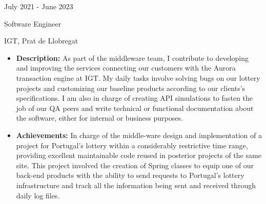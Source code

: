 \documentclass[a4paper,10pt]{article}
\newlength{\cvcolumngapwidth}
\newlength{\cvleftcolumnwidth}
\newlength{\cvrightcolumnwidth}
\newcommand{\cvtitlestyle}[1]{{\large\cvtitlefont\textcolor{cvtitlecolor}{#1}}}
\newcommand{\cvdurationstyle}[1]{{\small\cvdurationfont\textcolor{cvdurationcolor}{#1}}}
\newlength{\cvafteritemskipamount}
\newlength{\cvaftertitleskipamount}
\newlength{\cvparskip}
\newcommand{\cvitem}[2]{
    \begin{minipage}[t]{\cvleftcolumnwidth}
        \raggedleft #1
    \end{minipage}%
    \hspace{\cvcolumngapwidth}%
    \begin{minipage}[t]{\cvrightcolumnwidth}
        \setlength{\parskip}{\cvparskip} #2
    \end{minipage}

    \vspace{\cvafteritemskipamount}
}
\newcommand{\cvtitle}[1]{
    \cvtitlestyle{#1}

    \vspace{\cvaftertitleskipamount}
    \vspace{-\cvparskip}
}
\begin{document}
\cvitem{
    \cvdurationstyle{July 2021 - June 2023}
}{
    \cvtitle{Software Engineer}
    
    IGT, Prat de Llobregat 
    \vspace{5pt}
    \begin{itemize}[leftmargin=*]
        \item \textbf{Description:} As part of the middleware team, I contribute to developing and improving the services connecting our customers with the Aurora transaction engine at IGT. My daily tasks involve solving bugs on our lottery projects and customizing our baseline products according to our clients's specifications. I am also in charge of creating API simulations to fasten the job of our QA peers and write technical or functional documentation about the software, either for internal or business purposes.
        \vspace{5pt}
        \item \textbf{Achievements:} In charge of the middle-ware design and implementation of a project for Portugal's lottery within a considerably restrictive time range, providing excellent maintainable code reused in posterior projects of the same site. This project involved the creation of Spring classes to equip one of our back-end products with the ability to send requests to Portugal's lottery infrastructure and track all the information being sent and received through daily log files.
    \end{itemize}
}

\end{document}
